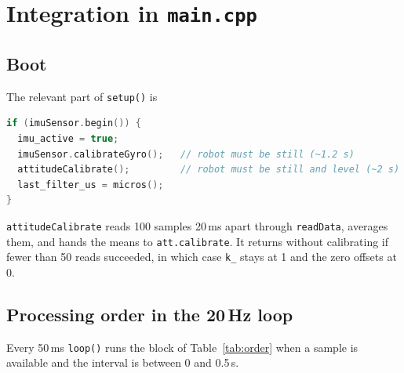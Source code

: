 \documentclass[11pt,a4paper]{report}
\newcommand{\code}[1]{\texttt{#1}}
\begin{document}
\chapter[Integration in main.cpp]{Integration in \texttt{main.cpp}}\label{ch:integration}

\section{Boot}
The relevant part of \code{setup()} is
\begin{lstlisting}[language=C++,caption={IMU start-up in \texttt{setup()}.},label={lst:boot}]
if (imuSensor.begin()) {
  imu_active = true;
  imuSensor.calibrateGyro();   // robot must be still (~1.2 s)
  attitudeCalibrate();         // robot must be still and level (~2 s)
  last_filter_us = micros();
}
\end{lstlisting}
\code{attitudeCalibrate} reads 100 samples 20\,ms apart through \code{readData}, averages them, and hands the means to \code{att.calibrate}. It returns without calibrating if fewer than 50 reads succeeded, in which case \code{k\_} stays at 1 and the zero offsets at 0.

\section{Processing order in the 20\,Hz loop}
Every 50\,ms \code{loop()} runs the block of Table~\ref{tab:order} when a sample is available and the interval is between 0 and 0.5\,s.
\end{document}
